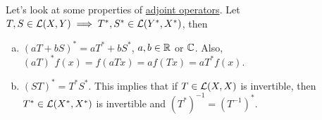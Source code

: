 Let's look at some properties of \hyperref[def:adjoint-op]{adjoint operators}. Let \(T, S\in \mathcal{\MakeUppercase{l}} (X, Y) \implies T^{\ast} , S^{\ast} \in \mathcal{\MakeUppercase{l}} (Y^{\ast} , X^{\ast} )\), then
\begin{enumerate}[(a)]
	\item \((aT + bS)^{\ast} = aT^{\ast} + bS^{\ast} \), \(a, b\in \mathbb{\MakeUppercase{r}} \) or \(\mathbb{\MakeUppercase{c}} \). Also, \((aT)^{\ast} f(x) = f(aTx) = af(Tx) = aT^{\ast} f(x)\).
	\item \((ST)^{\ast} = T^{\ast} S^{\ast} \). This implies that if \(T\in \mathcal{\MakeUppercase{l}} (X, X)\) is invertible, then \(T^{\ast} \in \mathcal{\MakeUppercase{l}} (X^{\ast} , X^{\ast} )\) is invertible and \((T^{\ast} )^{-1} = (T^{-1} )^{\ast} \).
\end{enumerate}

